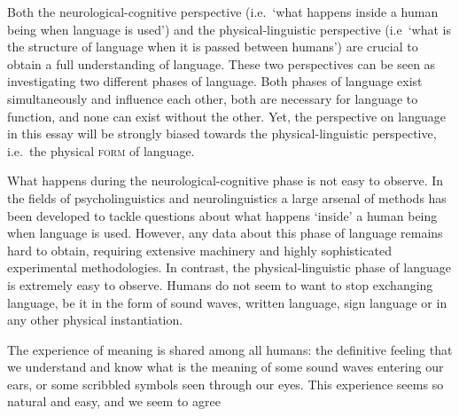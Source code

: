 %
Both the neurological-cognitive perspective (i.e.~`what happens inside a human being when language is used') and the physical-linguistic perspective (i.e~`what is the structure of language when it is passed between humans') are crucial to obtain a full understanding of language. These two perspectives can be seen as investigating two different phases of language. Both phases of language exist simultaneously and influence each other, both are necessary for language to function, and none can exist without the other. Yet, the perspective on language in this essay will be strongly biased towards the physical-linguistic perspective, i.e.~the physical \textsc{form} of language.

What happens during the neurological-cognitive phase is not easy to observe. In the fields of psycholinguistics and neurolinguistics a large arsenal of methods has been developed to tackle questions about what happens `inside' a human being when language is used. However, any data about this phase of language remains hard to obtain, requiring extensive machinery and highly sophisticated experimental methodologies. In contrast, the physical-linguistic phase of language is extremely easy to observe. Humans do not seem to want to stop exchanging language, be it in the form of sound waves, written language, sign language or in any other physical instantiation.

%

%
The experience of meaning is shared among all humans: the definitive feeling that we understand and know what is the meaning of some sound waves entering our ears, or some scribbled symbols seen through our eyes. This experience seems so natural and easy, and we seem to agree

